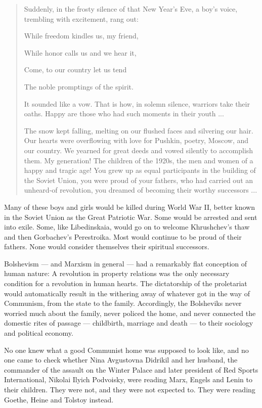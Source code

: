 \begin{quote}
Suddenly, in the frosty silence of that New Year's Eve, a boy's voice,
trembling with excitement, rang out:

While freedom kindles us, my friend,

While honor calls us and we hear it,

Come, to our country let us tend

The noble promptings of the spirit.

It sounded like a vow. That is how, in solemn silence, warriors take
their oaths. Happy are those who had such moments in their youth ...

The snow kept falling, melting on our flushed faces and silvering our
hair. Our hearts were overflowing with love for Pushkin, poetry, Moscow,
and our country. We yearned for great deeds and vowed silently to
accomplish them. My generation! The children of the 1920s, the men and
women of a happy and tragic age! You grew up as equal participants in
the building of the Soviet Union, you were proud of your fathers, who
had carried out an unheard-of revolution, you dreamed of becoming their
worthy successors ...
\end{quote}

Many of these boys and girls would be killed during World War II, better
known in the Soviet Union as the Great Patriotic War. Some would be
arrested and sent into exile. Some, like Libedinskaia, would go on to
welcome Khrushchev's thaw and then Gorbachev's Perestroika. Most would
continue to be proud of their fathers. None would consider themselves
their spiritual successors.

Bolshevism --- and Marxism in general --- had a remarkably flat
conception of human nature: A revolution in property relations was the
only necessary condition for a revolution in human hearts. The
dictatorship of the proletariat would automatically result in the
withering away of whatever got in the way of Communism, from the state
to the family. Accordingly, the Bolsheviks never worried much about the
family, never policed the home, and never connected the domestic rites
of passage --- childbirth, marriage and death --- to their sociology and
political economy.

No one knew what a good Communist home was supposed to look like, and no
one came to check whether Nina Avgustovna Didrikil and her husband, the
commander of the assault on the Winter Palace and later president of Red
Sports International, Nikolai Ilyich Podvoisky, were reading Marx,
Engels and Lenin to their children. They were not, and they were not
expected to. They were reading Goethe, Heine and Tolstoy instead.

